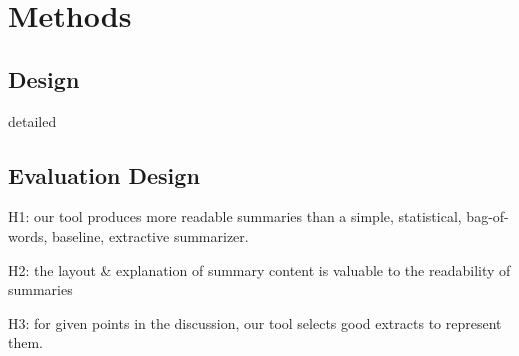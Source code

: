 \chapter{Methods \label{chap:requirements}}
  \section{Design}
    detailed
  \section{Evaluation Design}
    H1: our tool produces more readable summaries than a simple, statistical, bag-of-words, baseline, extractive summarizer.

    H2: the layout \& explanation of summary content is valuable to the readability of summaries

    H3: for given points in the discussion, our tool selects good extracts to represent them.
